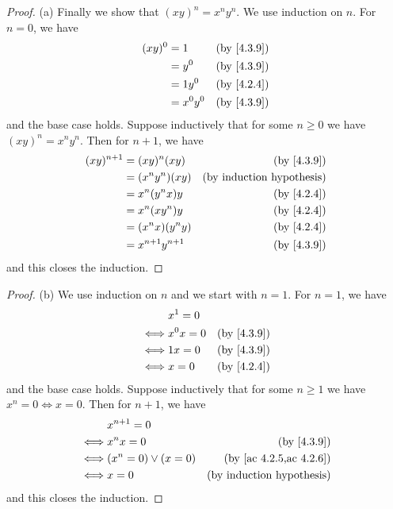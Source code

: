 \begin{proof}{(a)}
  Finally we show that \((xy)^n = x^n y^n\).
  We use induction on \(n\).
  For \(n = 0\), we have
  \begin{align*}
    (xy)^0 & = 1       & \text{(by \cref{4.3.9})} \\
           & = y^0     & \text{(by \cref{4.3.9})} \\
           & = 1y^0    & \text{(by \cref{4.2.4})} \\
           & = x^0 y^0 & \text{(by \cref{4.3.9})}
  \end{align*}
  and the base case holds.
  Suppose inductively that for some \(n \geq 0\) we have \((xy)^n = x^n y^n\).
  Then for \(n + 1\), we have
  \begin{align*}
    (xy)^{n + 1} & = (xy)^n (xy)         & \text{(by \cref{4.3.9})}         \\
                 & = (x^n y^n) (xy)      & \text{(by induction hypothesis)} \\
                 & = x^n (y^n x) y       & \text{(by \cref{4.2.4})}         \\
                 & = x^n (x y^n) y       & \text{(by \cref{4.2.4})}         \\
                 & = (x^n x)(y^n y)      & \text{(by \cref{4.2.4})}         \\
                 & = x^{n + 1} y^{n + 1} & \text{(by \cref{4.3.9})}
  \end{align*}
  and this closes the induction.
\end{proof}

\begin{proof}{(b)}
  We use induction on \(n\) and we start with \(n = 1\).
  For \(n = 1\), we have
  \begin{align*}
         & x^1 = 0                              \\
    \iff & x^0 x = 0 & \text{(by \cref{4.3.9})} \\
    \iff & 1x = 0    & \text{(by \cref{4.3.9})} \\
    \iff & x = 0     & \text{(by \cref{4.2.4})}
  \end{align*}
  and the base case holds.
  Suppose inductively that for some \(n \geq 1\) we have \(x^n = 0 \iff x = 0\).
  Then for \(n + 1\), we have
  \begin{align*}
         & x^{n + 1} = 0                                                 \\
    \iff & x^n x = 0              & \text{(by \cref{4.3.9})}             \\
    \iff & (x^n = 0) \lor (x = 0) & \text{(by \cref{ac 4.2.5,ac 4.2.6})} \\
    \iff & x = 0                  & \text{(by induction hypothesis)}
  \end{align*}
  and this closes the induction.
\end{proof}

